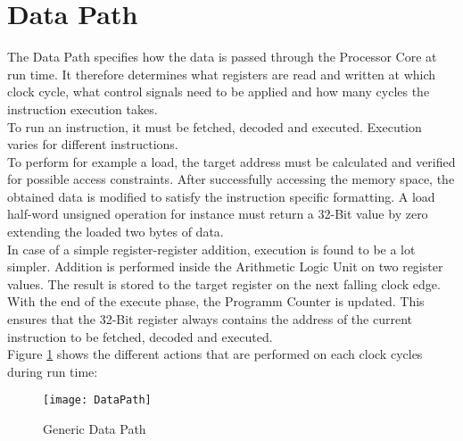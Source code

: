 \section{Data Path}
The Data Path specifies how the data is passed through the Processor Core at run time. It therefore determines what registers are read and written at which clock cycle, what control signals need to be applied and how many cycles the instruction execution takes.\\
To run an instruction, it must be fetched, decoded and executed. Execution varies for different instructions.\\
To perform for example a load, the target address must be calculated and verified for possible access constraints. After successfully accessing the memory space, the obtained data is modified to satisfy the instruction specific formatting. 
A load half-word unsigned operation for instance must return a 32-Bit value by zero extending the loaded two bytes of data.\\
In case of a simple register-register addition, execution is found to be a lot simpler. Addition is performed inside the Arithmetic Logic Unit on two register values. The result is stored to the target register on the next falling clock edge.\\
With the end of the execute phase, the Programm Counter is updated. This ensures that the 32-Bit register always contains the address of the current instruction to be fetched, decoded and executed.  \\
Figure \ref{fig:datapath_generic} shows the different actions that are performed on each clock cycles during run time:

\begin{figure}[H]
	\centering
	\texttt{[image: DataPath]}
	\caption{Generic Data Path}
	\label{fig:datapath_generic}
\end{figure}


